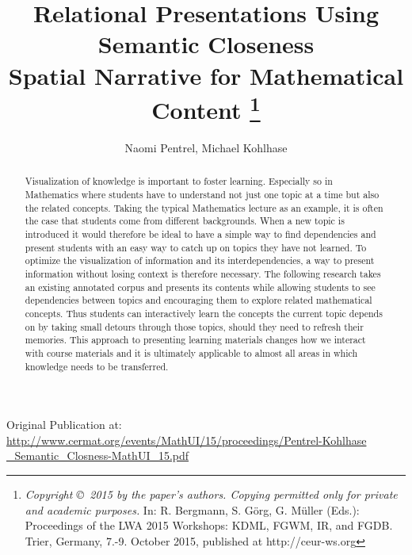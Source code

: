 \documentclass{llncs}
\title{Relational Presentations Using Semantic Closeness\\ Spatial Narrative for Mathematical Content \thanks{{\it Copyright \copyright\, 2015 by the paper's authors. Copying permitted only for private and academic purposes.} In: R. Bergmann, S. G{\"o}rg, G. M{\"u}ller (Eds.): Proceedings of the LWA 2015 Workshops: KDML, FGWM, IR, and FGDB. Trier, Germany, 7.-9. October 2015,  published at http://ceur-ws.org}}
\author{Naomi Pentrel, Michael Kohlhase}
\institute{Jacobs University Bremen}
\begin{document}
\maketitle


\begin{abstract}
Visualization of knowledge is important to foster learning. Especially so in Mathematics where students have to understand not just one topic at a time but also the related concepts. Taking the typical Mathematics lecture as an example, it is often the case that students come from different backgrounds. When a new topic is introduced it would therefore be ideal to have a simple way to find dependencies and present students with an easy way to catch up on topics they have not learned. To optimize the visualization of information and its interdependencies, a way to present information without losing context is therefore necessary. The following research takes an existing annotated corpus and presents its contents while allowing students to see dependencies between topics and encouraging them to explore related mathematical concepts. Thus students can interactively learn the concepts the current topic depends on by taking small detours through those topics, should they need to refresh their memories. This approach to presenting learning materials changes how we interact with course materials and it is ultimately applicable to almost all areas in which knowledge needs to be transferred.
\end{abstract}

Original Publication at:\\ \href{http://www.cermat.org/events/MathUI/15/proceedings/Pentrel-Kohlhase_Semantic_Closness-MathUI_15.pdf}{http://www.cermat.org/events/MathUI/15/proceedings/Pentrel-Kohlhase\\\_Semantic\_Closness-MathUI\_15.pdf}
\end{document}
